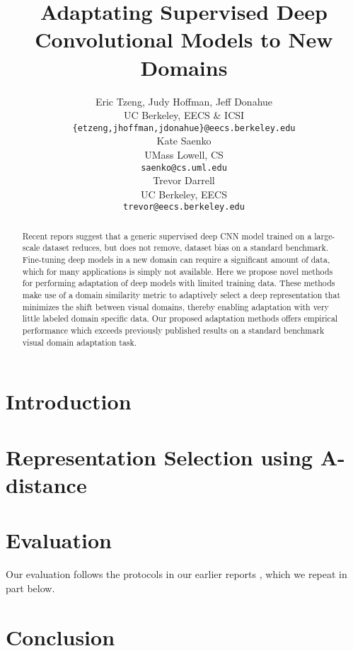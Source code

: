 \documentclass{article} %
\title{Adaptating Supervised Deep Convolutional Models to New Domains}
\author{
Eric Tzeng, Judy Hoffman, Jeff Donahue \\
UC Berkeley, EECS \& ICSI\\
\footnotesize{\texttt{\{etzeng,jhoffman,jdonahue\}@eecs.berkeley.edu} }\\
\And
Kate Saenko \\
UMass Lowell, CS  \\
\footnotesize{\texttt{saenko@cs.uml.edu}} \\
\And
Trevor Darrell \\
UC Berkeley, EECS\\
\footnotesize{\texttt{trevor@eecs.berkeley.edu}} \\
}
\begin{document}
\maketitle

\begin{abstract}
Recent repors suggest that  a generic supervised deep CNN model trained on a large-scale dataset reduces, but does not remove, dataset bias on a standard benchmark. Fine-tuning deep models in a new domain can require a significant amount of data, which for many applications is simply not available. Here
we propose novel methods for performing adaptation of deep models with limited training data.
These methods make use of a domain similarity metric to adaptively select a deep representation that minimizes the shift between visual domains, thereby enabling adaptation with very little labeled domain specific data.
Our proposed adaptation methods offers empirical performance which exceeds previously published results on a standard benchmark visual domain adaptation task.

\end{abstract}

\section{Introduction}


%

\vspace{-.3cm}
\section{Representation Selection using A-distance}
\label{sec:adapt-algs}
\vspace{-.2cm}


\section{Evaluation}
Our evaluation follows the protocols in our earlier reports \cite{deeplearning-arxiv-2013,hoffman-iclr14}, which we repeat in part below.


\section{Conclusion}



\small{


}
\end{document}

